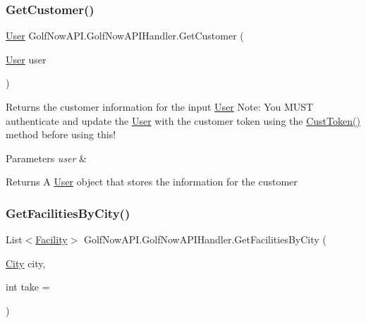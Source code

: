 \subsubsection{\texorpdfstring{GetCustomer()}{GetCustomer()}}
{\footnotesize\ttfamily \mbox{\hyperlink{class_golf_now_a_p_i_1_1_user}{User}} Golf\+Now\+A\+P\+I.\+Golf\+Now\+A\+P\+I\+Handler.\+Get\+Customer (\begin{DoxyParamCaption}\item[{\mbox{\hyperlink{class_golf_now_a_p_i_1_1_user}{User}}}]{user }\end{DoxyParamCaption})\hspace{0.3cm}{\ttfamily [inline]}}



Returns the customer information for the input \mbox{\hyperlink{class_golf_now_a_p_i_1_1_user}{User}} Note\+: You M\+U\+ST authenticate and update the \mbox{\hyperlink{class_golf_now_a_p_i_1_1_user}{User}} with the customer token using the \mbox{\hyperlink{class_golf_now_a_p_i_1_1_golf_now_a_p_i_handler_a8ba0b542b68c1e48166b59c6d6b167fd}{Cust\+Token()}} method before using this! 


\begin{DoxyParams}{Parameters}
{\em user} & \\
\hline
\end{DoxyParams}
\begin{DoxyReturn}{Returns}
A \mbox{\hyperlink{class_golf_now_a_p_i_1_1_user}{User}} object that stores the information for the customer
\end{DoxyReturn}
\mbox{\label{class_golf_now_a_p_i_1_1_golf_now_a_p_i_handler_a075e65b0fa1732030985ab11a1efe429}} 
\subsubsection{\texorpdfstring{GetFacilitiesByCity()}{GetFacilitiesByCity()}}
{\footnotesize\ttfamily List$<$\mbox{\hyperlink{class_golf_now_a_p_i_1_1_facility}{Facility}}$>$ Golf\+Now\+A\+P\+I.\+Golf\+Now\+A\+P\+I\+Handler.\+Get\+Facilities\+By\+City (\begin{DoxyParamCaption}\item[{\mbox{\hyperlink{class_golf_now_a_p_i_1_1_city}{City}}}]{city,  }\item[{int}]{take = {} }\end{DoxyParamCaption})\hspace{0.3cm}{\ttfamily [inline]}}



